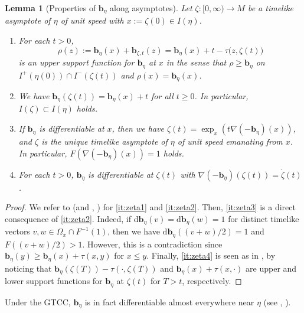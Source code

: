 \documentclass[a4paper,11pt]{article}
\numberwithin{equation}{section}
\theoremstyle{definition}
\theoremstyle{plain}
\newtheorem{lemma}[definition]{Lemma}
\newcommand{\lra}{\longrightarrow}
\newcommand{\dd}{\mathrm{d}}
\newcommand{\bb}{\ensuremath{\mathbf{b}}}
\begin{document}
\begin{lemma}[Properties of $\bb_\eta$ along asymptotes]\label{lm:zeta}
Let $\zeta\colon [0,\infty) \lra M$ be a timelike asymptote of $\eta$ of unit speed
with $x:=\zeta(0) \in I(\eta)$.
\begin{enumerate}[{\rm (i)}]
\item\label{it:zeta1}
For each $t>0$,
\[ \rho(z) :=\bb_\eta(x) +\bb_{\zeta,t}(z) =\bb_\eta(x) +t -\tau\big( z,\zeta(t) \big) \]
is an \emph{upper support function} for $\bb_\eta$ at $x$ in the sense that
$\rho \ge \bb_\eta$ on $I^+(\eta(0)) \cap I^-(\zeta(t))$ and $\rho(x)=\bb_\eta(x)$.

\item\label{it:zeta2}
We have $\bb_\eta(\zeta(t)) =\bb_\eta(x)+t$ for all $t \ge 0$.
In particular, $I(\zeta) \subset I(\eta)$ holds.

\item\label{it:zeta3}
If $\bb_\eta$ is differentiable at $x$, then we have $\zeta(t)=\exp_x(t\nabla(-\bb_\eta)(x))$, and $\zeta$ is the unique timelike asymptote of $\eta$ of unit speed emanating from $x$.
In particular, $F(\nabla(-\bb_\eta)(x))=1$ holds.

\item\label{it:zeta4}
For each $t>0$, $\bb_\eta$ is differentiable at $\zeta(t)$ with $\nabla(-\bb_\eta)(\zeta(t)) =\dot{\zeta}(t)$.
\end{enumerate}
\end{lemma}

\begin{proof}
We refer to \cite[Lemma~5.2]{LMO3} (and  \cite[\S 2.2]{Eschenburg:1988},  \cite[Lemma~2.5, Proposition~2.6]{GH}) for \eqref{it:zeta1} and \eqref{it:zeta2}.
Then, \eqref{it:zeta3} is a direct consequence of \eqref{it:zeta2}.
Indeed, if $\dd\bb_\eta(v)=\dd\bb_\eta(w)=1$ for distinct timelike vectors $v,w \in \Omega_x \cap F^{-1}(1)$, then we have $\dd\bb_\eta((v+w)/2)=1$ and $F((v+w)/2)>1$.
However, this is a contradiction since $\bb_\eta(y) \ge \bb_\eta(x) +\tau(x,y)$ for $x \le y$.
Finally, \eqref{it:zeta4} is seen as in \cite[\S 2.2]{Eschenburg:1988}, by noticing that $\bb_\eta(\zeta(T))-\tau(\cdot,\zeta(T))$ and $\bb_\eta(x)+\tau(x,\cdot)$ are upper and lower support functions for $\bb_\eta$ at $\zeta(t)$ for $T>t$, respectively.
\end{proof}

Under the GTCC, $\bb_\eta$ is in fact differentiable almost everywhere near $\eta$ (see \cite[Theorem~5.3]{LMO3}, \cite[Theorem~3.7]{GH}).
\end{document}
